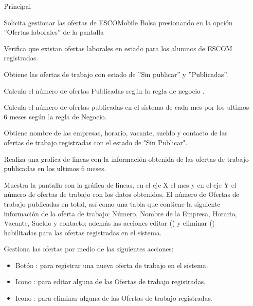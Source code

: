 \begin{UCtrayectoria}{Principal}

	\UCpaso [\UCactor] Solicita gestionar las ofertas de ESCOMobile Bolsa presionando en la opción ''Ofertas laborales'' de la pantalla 

	\UCpaso Verifica que existan ofertas laborales en estado para los alumnos de ESCOM registradas.  

	\UCpaso Obtiene las ofertas de trabajo con estado de ''Sin publicar'' y ''Publicadas''.

	\UCpaso Calcula el número de ofertas Publicadas según la regla de negocio .

	\UCpaso Calcula el número de ofertas publicadas en el sistema de cada mes por los ultimos 6 meses según la regla de Negocio.

	\UCpaso Obtiene nombre de las empresas, horario, vacante, sueldo y contacto de las ofertas de trabajo registradas con el estado de "Sin Publicar".
	
	\UCpaso Realiza una grafica de lineas con la información obtenida de las ofertas de trabajo publicadas en los ultimos 6 meses.
	
	\UCpaso Muestra la pantalla  con la gráfica de lineas, en el eje X el mes y en el eje Y el número de ofertas de trabajo con los datos obtenidos. El número de Ofertas de trabajo publicadas en total, así como una tabla que contiene la siguiente información de la oferta de trabajo: Número, Nombre de la Empresa, Horario, Vacante, Sueldo y contacto; además las acciones editar () y eliminar () habilitadas para las ofertas registradas en el sistema. \label{EM-BolsaWeb-CU1-TAA}

	\UCpaso [\UCactor] Gestiona las ofertas por medio de las siguientes acciones: 
	\begin{itemize}
		\item Botón : para registrar una nueva oferta de trabajo en el sistema.
		\item Icono : para editar alguna de las Ofertas de trabajo registradas.
		\item Icono : para eliminar alguna de las Ofertas de trabajo registradas.
	\end{itemize}

\end{UCtrayectoria}

